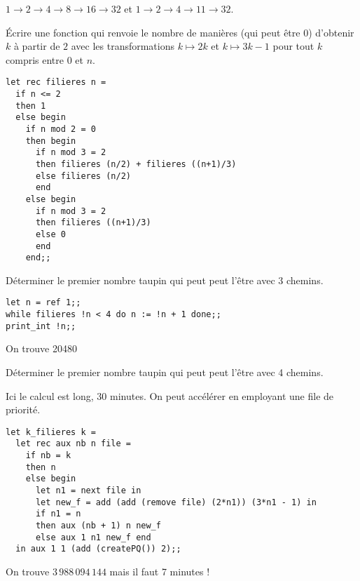 $1 \rightarrow 2 \rightarrow 4 \rightarrow 8 \rightarrow 16 \rightarrow 32$ et
$1 \rightarrow 2 \rightarrow 4 \rightarrow 11 \rightarrow 32$.
\begin{Exercise}[title=Nombre de filières]
Écrire une fonction  qui renvoie le nombre de manières (qui peut être 0) d'obtenir $k$ à partir de $2$ avec les transformations $k \mapsto 2k$ et $k \mapsto 3k-1$ pour tout $k$ compris entre 0 et $n$.
\end{Exercise}
\begin{Answer}
\begin{lstlisting}
let rec filieres n =
  if n <= 2
  then 1
  else begin
    if n mod 2 = 0
    then begin
      if n mod 3 = 2 
      then filieres (n/2) + filieres ((n+1)/3)
      else filieres (n/2) 
      end
    else begin
      if n mod 3 = 2
      then filieres ((n+1)/3)
      else 0
      end
    end;;           
\end{lstlisting}
\end{Answer}
\begin{Exercise}[title=3 filières]
Déterminer le premier nombre taupin qui peut peut l'être avec 3 chemins.
\end{Exercise}
\begin{Answer}
\begin{lstlisting}
let n = ref 1;;
while filieres !n < 4 do n := !n + 1 done;;
print_int !n;;
\end{lstlisting}

On trouve 20480
\end{Answer}
\begin{Exercise}[title=4 filières]
Déterminer le premier nombre taupin qui peut peut l'être avec 4 chemins.
\end{Exercise}
\begin{Answer}
Ici le calcul est long, 30 minutes. On peut accélérer en employant une file de priorité.
\begin{lstlisting}
let k_filieres k = 
  let rec aux nb n file =
    if nb = k
    then n
    else begin
      let n1 = next file in
      let new_f = add (add (remove file) (2*n1)) (3*n1 - 1) in
      if n1 = n
      then aux (nb + 1) n new_f
      else aux 1 n1 new_f end
  in aux 1 1 (add (createPQ()) 2);;
  \end{lstlisting}

On trouve $3\,988\,094\,144$ mais il faut 7 minutes !
\end{Answer}
